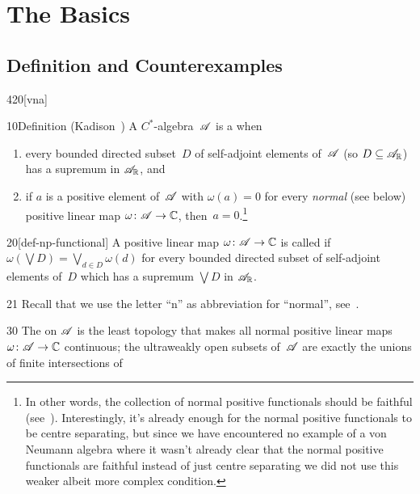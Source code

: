 \section{The Basics}
\subsection{Definition and Counterexamples}
\begin{parsec}{420}[vna]%
\begin{point}{10}{Definition (Kadison~\cite{kadison1956})}%
A $C^*$-algebra~$\mathscr{A}$
is a %
when
\begin{enumerate}
\item
every bounded directed subset~$D$
of self-adjoint elements of~$\mathscr{A}$ (so $D\subseteq \mathscr{A}_{\mathbb{R}}$) 
    has a supremum %
    in $\mathscr{A}_{\mathbb{R}}$, and
\item
if $a$ is a positive element of~$\mathscr{A}$
with $\omega(a)=0$ for every \emph{normal} (see below) positive 
linear map $\omega\colon \mathscr{A}\to \mathbb{C}$,
then~$a=0$.\footnote{In other words,
the collection of normal positive functionals should be faithful
(see~).
Interestingly,
it's already enough for the normal positive 
functionals to be centre separating,
but since we have encountered no example
of a von Neumann algebra
where it wasn't already clear that the normal positive 
functionals are faithful
instead of just centre separating
we did not use this weaker albeit more complex condition.}
\end{enumerate}
\spacingfix%
\begin{point}{20}[def-np-functional]%
A positive linear map $\omega\colon \mathscr{A}\to \mathbb{C}$
is called %
if $\omega(\bigvee D) = \bigvee_{d\in D} \omega(d)$
for every bounded directed subset of self-adjoint elements of~$D$
which has a supremum $\bigvee D$ in $\mathscr{A}_{\mathbb{R}}$.
\begin{point}{21}
Recall that we use the letter ``n'' as abbreviation
for ``normal'', see~.
\end{point}
\end{point}%
\begin{point}{30}%
The 
on $\mathscr{A}$
is the least topology
that makes all normal positive linear maps $\omega\colon \mathscr{A}\to \mathbb{C}$
continuous; the ultraweakly open subsets of~$\mathscr{A}$
are exactly the unions
of finite intersections of

\end{point}
\end{point}
\end{parsec}
